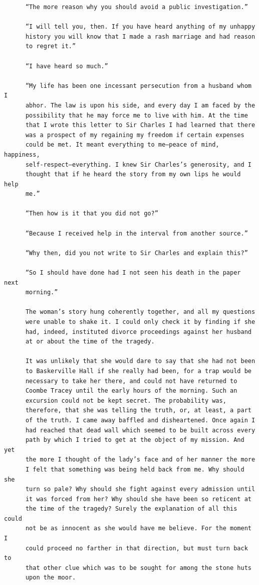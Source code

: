 \documentclass{article}
\begin{document}
\begin{verbatim}
      “The more reason why you should avoid a public investigation.”

      “I will tell you, then. If you have heard anything of my unhappy
      history you will know that I made a rash marriage and had reason
      to regret it.”

      “I have heard so much.”

      “My life has been one incessant persecution from a husband whom I
      abhor. The law is upon his side, and every day I am faced by the
      possibility that he may force me to live with him. At the time
      that I wrote this letter to Sir Charles I had learned that there
      was a prospect of my regaining my freedom if certain expenses
      could be met. It meant everything to me—peace of mind, happiness,
      self-respect—everything. I knew Sir Charles’s generosity, and I
      thought that if he heard the story from my own lips he would help
      me.”

      “Then how is it that you did not go?”

      “Because I received help in the interval from another source.”

      “Why then, did you not write to Sir Charles and explain this?”

      “So I should have done had I not seen his death in the paper next
      morning.”

      The woman’s story hung coherently together, and all my questions
      were unable to shake it. I could only check it by finding if she
      had, indeed, instituted divorce proceedings against her husband
      at or about the time of the tragedy.

      It was unlikely that she would dare to say that she had not been
      to Baskerville Hall if she really had been, for a trap would be
      necessary to take her there, and could not have returned to
      Coombe Tracey until the early hours of the morning. Such an
      excursion could not be kept secret. The probability was,
      therefore, that she was telling the truth, or, at least, a part
      of the truth. I came away baffled and disheartened. Once again I
      had reached that dead wall which seemed to be built across every
      path by which I tried to get at the object of my mission. And yet
      the more I thought of the lady’s face and of her manner the more
      I felt that something was being held back from me. Why should she
      turn so pale? Why should she fight against every admission until
      it was forced from her? Why should she have been so reticent at
      the time of the tragedy? Surely the explanation of all this could
      not be as innocent as she would have me believe. For the moment I
      could proceed no farther in that direction, but must turn back to
      that other clue which was to be sought for among the stone huts
      upon the moor.


\end{verbatim}
\end{document}
